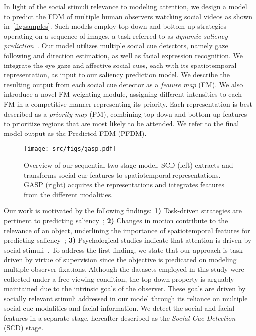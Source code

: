 \documentclass{article}
\begin{document}
In light of the social stimuli relevance to modeling attention, we design a model to predict the FDM of multiple human observers watching social videos as shown in~\autoref{fig:samples}. Such models employ top-down and bottom-up strategies operating on a sequence of images, a task referred to as \textit{dynamic saliency prediction}~\cite{bak2017spatio,borji2019saliency}. Our model utilizes multiple social cue detectors, namely gaze following and direction estimation, as well as facial expression recognition.  We integrate the eye gaze and affective social cues, each with its spatiotemporal representation, as input to our saliency prediction model. We describe the resulting output from each social cue detector as a \textit{feature map} (FM). We also introduce a novel FM weighting module, assigning different intensities to each FM in a competitive manner representing its priority. Each representation is best described as a \textit{priority map} (PM), combining top-down and bottom-up features to prioritize regions that are most likely to be attended. We refer to the final model output as the Predicted FDM (PFDM).

\begin{figure*}[ht]
\centering
\texttt{[image: src/figs/gasp.pdf]}
\caption{Overview of our sequential two-stage model. SCD (left) extracts and transforms social cue features to spatiotemporal representations. GASP (right) acquires the representations and integrates features from the different modalities.} \label{fig:full_model}
\end{figure*}

Our work is motivated by the following findings:
\textbf{1)} Task-driven strategies are pertinent to predicting saliency~\cite{foulsham2011modeling};
\textbf{2)} Changes in motion contribute to the relevance of an object, underlining the importance of spatiotemporal features for predicting saliency~\cite{min2020multimodal};
\textbf{3)} Psychological studies indicate that attention is driven by social stimuli~\cite{salley2016conceptualizing}.
To address the first finding, we state that our approach is task-driven by virtue of supervision since the objective is predicated on modeling multiple observer fixations. Although the datasets employed in this study were collected under a free-viewing condition, the top-down property is arguably maintained due to the intrinsic goals of the observer. These goals are driven by socially relevant stimuli addressed in our model through its reliance on multiple social cue modalities and facial information.
We detect the social and facial features in a separate stage, hereafter described as the \textit{Social Cue Detection} (SCD) stage.
\end{document}
